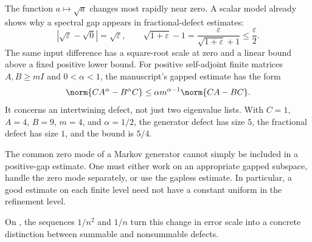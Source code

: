 The function $a\mapsto\sqrt a$ changes most rapidly near zero. A scalar model already shows why a spectral gap appears in fractional-defect estimates:
\[
|\sqrt\varepsilon-\sqrt0|=\sqrt\varepsilon,
\qquad
\sqrt{1+\varepsilon}-1
=\frac{\varepsilon}{\sqrt{1+\varepsilon}+1}\le\frac\varepsilon2.
\]
The same input difference has a square-root scale at zero and a linear bound above a fixed positive lower bound.
For positive self-adjoint finite matrices $A,B\ge mI$ and $0<\alpha<1$, the manuscript's gapped estimate has the form
\[
\norm{CA^\alpha-B^\alpha C}
\le \alpha m^{\alpha-1}\norm{CA-BC}.
\]
It concerns an intertwining defect, not just two eigenvalue lists. With $C=1$, $A=4$, $B=9$, $m=4$, and $\alpha=1/2$, the generator defect has size $5$, the fractional defect has size $1$, and the bound is $5/4$.

The common zero mode of a Markov generator cannot simply be included in a positive-gap estimate. One must either work on an appropriate gapped subspace, handle the zero mode separately, or use the gapless estimate. In particular, a good estimate on each finite level need not have a constant uniform in the refinement level.

On , the sequences $1/n^2$ and $1/n$ turn this change in error scale into a concrete distinction between summable and nonsummable defects.


